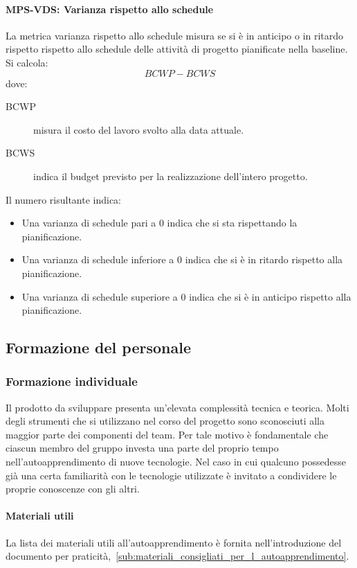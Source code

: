 \documentclass[../norme-di-progetto.tex]{subfiles}
\begin{document}
\paragraph{MPS-VDS\@: Varianza rispetto allo schedule}%
\label{par:MPS-VDS_varianza_rispetto_allo_schedule}

La metrica varianza rispetto allo schedule misura se si è in anticipo o in ritardo rispetto rispetto allo schedule delle attività di progetto pianificate nella baseline. Si calcola:
\[
  BCWP - BCWS
\]
dove:
\begin{description}
  \item [BCWP] misura il costo del lavoro svolto alla data attuale.
  \item [BCWS] indica il budget previsto per la realizzazione dell'intero progetto.
\end{description}
Il numero risultante indica:
\begin{itemize}
  \item Una varianza di schedule pari a 0 indica che si sta rispettando la pianificazione.
  \item Una varianza di schedule inferiore a 0 indica che si è in ritardo rispetto alla pianificazione.
  \item Una varianza di schedule superiore a 0 indica che si è in anticipo rispetto alla pianificazione.
\end{itemize}

\subsection{Formazione del personale}%
\label{sub:formazione_del_personale}

\subsubsection{Formazione individuale}%
\label{subs:formazione_individuale}

Il prodotto da sviluppare presenta un'elevata complessità tecnica e teorica.
Molti degli strumenti che si utilizzano nel corso del progetto sono sconosciuti alla maggior parte dei componenti del team.
Per tale motivo è fondamentale che ciascun membro del gruppo investa una parte del proprio tempo nell'autoapprendimento di nuove tecnologie.
Nel caso in cui qualcuno possedesse già una certa familiarità con le tecnologie utilizzate è invitato a condividere le proprie conoscenze con gli altri.

\paragraph{Materiali utili}%
\label{par:materiali_utili}

La lista dei materiali utili all'autoapprendimento è fornita nell'introduzione del documento per praticità,~\ref{sub:materiali_consigliati_per_l_autoapprendimento}.

\end{document}
